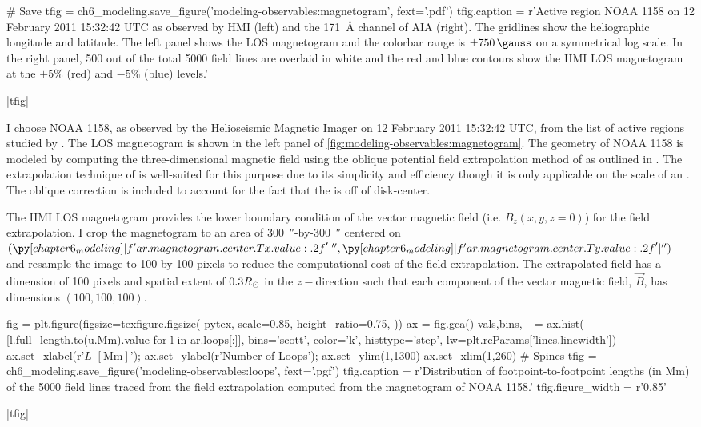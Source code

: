 \begin{pycode}
# Save
tfig = ch6_modeling.save_figure('modeling-observables:magnetogram', fext='.pdf')
tfig.caption = r'Active region NOAA 1158 on 12 February 2011 15:32:42 UTC as observed by HMI (left) and the \SI{171}{\angstrom} channel of AIA (right). The gridlines show the heliographic longitude and latitude. The left panel shows the LOS magnetogram and the colorbar range is $\pm\SI{750}{\gauss}$ on a symmetrical log scale. In the right panel, 500 out of the total 5000 field lines are overlaid in white and the red and blue contours show the HMI LOS magnetogram at the $+5\%$ (red) and $-5\%$ (blue) levels.'
\end{pycode}
|tfig|

I choose \AR{} NOAA 1158, as observed by the Helioseismic Magnetic Imager \citep[HMI,][]{hoeksema_helioseismic_2014} on 12 February 2011 15:32:42 UTC, from the list of active regions studied by \citet{warren_systematic_2012}. The LOS magnetogram is shown in the left panel of \autoref{fig:modeling-observables:magnetogram}. The geometry of \AR{} NOAA 1158 is modeled by computing the three-dimensional magnetic field using the oblique potential field extrapolation method of \citet{schmidt_observable_1964} as outlined in \citet[Section 3]{sakurai_greens_1982}. The extrapolation technique of \citeauthor{schmidt_observable_1964} is well-suited for this purpose due to its simplicity and efficiency though it is only applicable on the scale of an \AR{}. The oblique correction is included to account for the fact that the \AR{} is off of disk-center. 

The HMI LOS magnetogram provides the lower boundary condition of the vector magnetic field (i.e. $B_z(x,y,z=0)$) for the field extrapolation. I crop the magnetogram to an area of \SI{300}{\arcsecond}-by-\SI{300}{\arcsecond} centered on $(\py[chapter6_modeling]|f'{ar.magnetogram.center.Tx.value:.2f}'|\si{\arcsecond},\py[chapter6_modeling]|f'{ar.magnetogram.center.Ty.value:.2f}'|\si{\arcsecond})$ and resample the image to 100-by-100 pixels to reduce the computational cost of the field extrapolation. The extrapolated field has a dimension of 100 pixels and spatial extent of $0.3R_{\odot}$ in the $z-$direction such that each component of the vector magnetic field, $\vec{B}$, has dimensions $(100,100,100)$.

\begin{pycode}
fig = plt.figure(figsize=texfigure.figsize(
    pytex,
    scale=0.85,
    height_ratio=0.75,
))
ax = fig.gca()
vals,bins,_ = ax.hist(
    [l.full_length.to(u.Mm).value for l in ar.loops[:]],
    bins='scott', color='k', histtype='step', lw=plt.rcParams['lines.linewidth'])
ax.set_xlabel(r'$L$ $[\si{\mega\m}]$');
ax.set_ylabel(r'Number of Loops');
ax.set_ylim(1,1300)
ax.set_xlim(1,260)
# Spines
tfig = ch6_modeling.save_figure('modeling-observables:loops', fext='.pgf')
tfig.caption = r'Distribution of footpoint-to-footpoint lengths (in \si{\mega\m}) of the 5000 field lines traced from the field extrapolation computed from the magnetogram of NOAA 1158.'
tfig.figure_width = r'0.85\textwidth'
\end{pycode}
|tfig|

